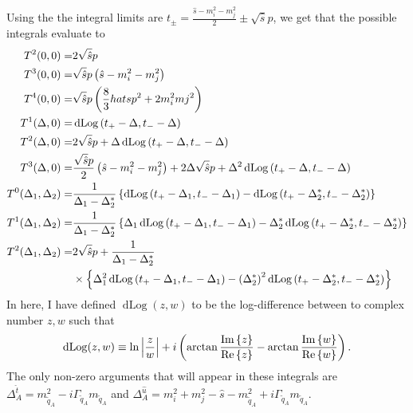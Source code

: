 \documentclass[../main.tex]{subfiles}
\begin{document}
\\
\\
Using the the integral limits are \(t_\pm = \frac{\hat{s} - m_i^2 - m_j^2}{2}
\pm \sqrt{\hat{s}}p\), we get that the possible integrals evaluate to
\begin{subequations}
	\begin{align}
		T^2(0, 0) =                         & 2\sqrt{\hat{s}}p
		\\
		T^3(0, 0) =                         &
		\sqrt{\hat{s}}p\left(\hat{s} - m_i^2 - m_j^2\right)
		\\
		T^4(0, 0) =                         & \sqrt{\hat{s}}p
		\left(\frac{8}{3}hat{s}p^2 + 2m_i^2mj^2\right)
		\\
		T^1\!\left(\Delta, 0\right) =          &
		\operatorname{dLog}\left(t_+ - \Delta, t_- - \Delta\right)
		\\
		T^2\!\left(\Delta, 0\right) =          & 2\sqrt{\hat{s}}p + \Delta
		\operatorname{dLog}\left(t_+ - \Delta, t_- - \Delta\right)
		\\
		T^3\!\left(\Delta, 0\right) =          &
		\frac{\sqrt{\hat{s}}p}{2}\left(\hat{s} - m_i^2 - m_j^2\right) +
		2\Delta\sqrt{\hat{s}}p	+ \Delta^2
		\operatorname{dLog}\left(t_+ - \Delta,
			t_- - \Delta\right)
		\\
		T^0\!\left(\Delta_1, \Delta_2\right) = & \frac{1}{\Delta_1 -
			\Delta_2^\ast} \left\{\operatorname{dLog}\left(t_+
				- \Delta_1, t_- -
				\Delta_1\right) - \operatorname{dLog}\left(t_+ -
				\Delta_2^\ast, t_- -
				\Delta_2^\ast\right)\right\}
		\\
		T^1\!\left(\Delta_1, \Delta_2\right) = & \frac{1}{\Delta_1 -
			\Delta_2^\ast} \left\{\Delta_1
			\operatorname{dLog}\left(t_+ - \Delta_1,
				t_- - \Delta_1\right) - \Delta_2^\ast
			\operatorname{dLog}\left(t_+ -
				\Delta_2^\ast, t_- - \Delta_2^\ast\right)\right\}
		\\
		\nonumber
		T^2\!\left(\Delta_1, \Delta_2\right) = & 2\sqrt{\hat{s}}p	+
		\frac{1}{\Delta_1 - \Delta_2^\ast}
		\\
		                                    & \times
		\left\{\Delta_1^2 \operatorname{dLog}\left(t_+ - \Delta_1,
				t_- - \Delta_1\right)
			- \left(\Delta_2^\ast\right)^2
			\operatorname{dLog}\left(t_+ - \Delta_2^\ast,
				t_- - \Delta_2^\ast\right)\right\}
	\end{align}
\end{subequations}
In here, I have defined \(\operatorname{dLog}(z, w)\) to be the log-difference
between to complex number \(z, w\) such that
\begin{equation}
	\operatorname{dLog}(z, w) \equiv \ln\left|\frac{z}{w}\right| +
	i\left(\arctan\frac{\operatorname{Im}\left\{z\right\}}{\operatorname{Re}\left\{z\right\}} - \arctan\frac{\operatorname{Im}\left\{w\right\}}{\operatorname{Re}\left\{w\right\}}\right).
\end{equation}
The only non-zero arguments that will appear in these integrals are
\(\Delta^{\hat{t}}_A = m_{\tilde{q}_A}^2 - i\Gamma_{\tilde{q}_A}
m_{\tilde{q}_A}\) and \(\Delta^{\hat{u}}_A = m_i^2 + m_j^2 - \hat{s} -
m_{\tilde{q}_A}^2 + i\Gamma_{\tilde{q}_A} m_{\tilde{q}_A}\).
\end{document}
